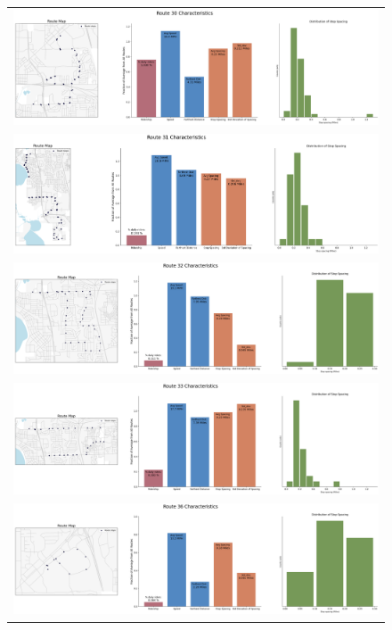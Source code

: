 \documentclass[letter]{article}
\begin{document}
\begin{figure}
\begin{center}
\begin{tabular}{ c }

  \includegraphics[width=150mm]{Route_30.png}  \\
  \includegraphics[width=150mm]{Route_31.png}  \\
  \includegraphics[width=150mm]{Route_32.png}  \\
  \includegraphics[width=150mm]{Route_33.png} \\ 
  \includegraphics[width=150mm]{Route_36.png}  \\
  
  \end{tabular}
\end{center}
\end{figure}
\end{document}
